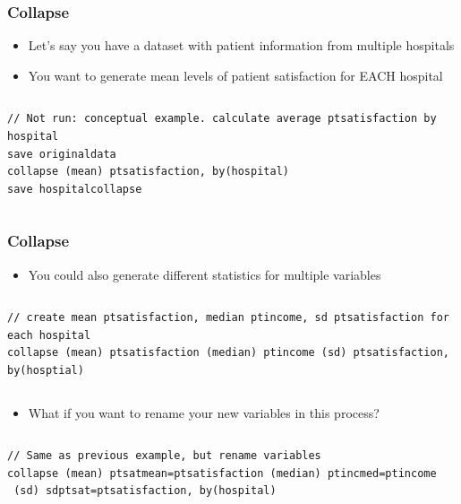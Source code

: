 \documentclass[table]{beamer}
\begin{document}
\begin{frame}[fragile]
\frametitle{Collapse}
\label{sec-7-3}

\begin{itemize}
\item Let's say you have a dataset with patient
  information from multiple hospitals
\item You want to generate mean levels of patient
  satisfaction for EACH hospital
\end{itemize}
\vspace{-.5em} \begin{columns}  \begin{block}{}

\begin{verbatim}
// Not run: conceptual example. calculate average ptsatisfaction by hospital
save originaldata
collapse (mean) ptsatisfaction, by(hospital)
save hospitalcollapse
\end{verbatim}
\end{block} \end{columns}
\end{frame}
\begin{frame}[fragile]
\frametitle{Collapse}
\label{sec-7-4}

\begin{itemize}
\item You could also generate different statistics for
   multiple variables
\end{itemize}
\vspace{-.5em} \begin{columns}  \begin{block}{}

\begin{verbatim}
// create mean ptsatisfaction, median ptincome, sd ptsatisfaction for each hospital
collapse (mean) ptsatisfaction (median) ptincome (sd) ptsatisfaction, by(hosptial)
\end{verbatim}
\end{block} \end{columns}
\begin{itemize}
\item What if you want to rename your new variables in
   this process?
\end{itemize}

\vspace{-.5em} \begin{columns}  \begin{block}{}

\begin{verbatim}
// Same as previous example, but rename variables
collapse (mean) ptsatmean=ptsatisfaction (median) ptincmed=ptincome
 (sd) sdptsat=ptsatisfaction, by(hospital)
\end{verbatim}
\end{block} \end{columns}
\end{frame}
\end{document}
